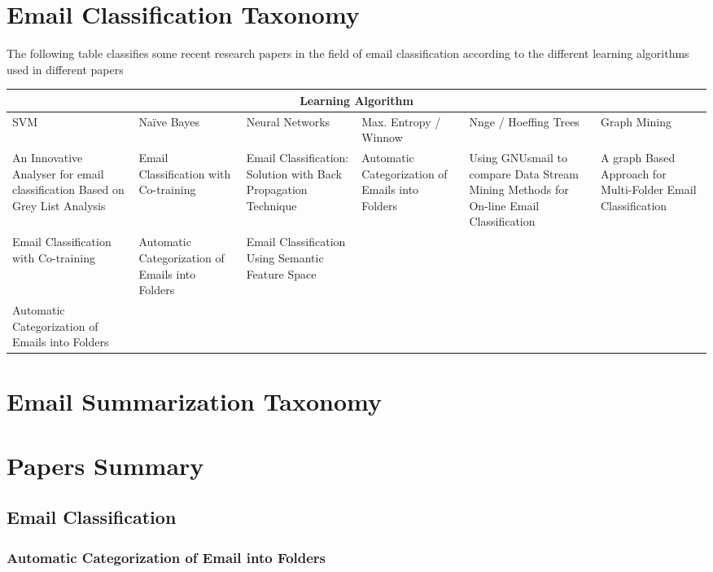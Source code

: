 \documentclass[12pt]{article}
\begin{document}
\section{Email Classification Taxonomy}
The following table classifies some recent research papers in the field of email classification according to the different learning algorithms used in different papers


\begin{tabular}{|p{2cm}|p{2cm}|p{2cm}|p{2cm}|p{2cm}|p{2cm}|}
\hline
\multicolumn{6}{|c|}{Learning Algorithm} \\
\hline
SVM & Naïve Bayes & Neural Networks & Max. Entropy / Winnow & Nnge / Hoeffing Trees & Graph Mining \\ \hline
An Innovative Analyser for email classification Based on Grey List Analysis &
Email Classification with Co-training &
Email Classification: Solution with Back Propagation Technique & 
Automatic Categorization of Emails into Folders &
Using GNUsmail to compare Data Stream Mining Methods for On-line Email Classification &
A graph Based Approach for Multi-Folder Email Classification \\ \hline

Email Classification with Co-training &
Automatic Categorization of Emails into Folders &
Email Classification Using Semantic Feature Space & 
&
&
 \\ \hline

Automatic Categorization of Emails into Folders &
&
& 
&
&

 \\
\hline
\end{tabular}

\section{Email Summarization Taxonomy}

\section{Papers Summary}
\subsection{Email Classification}

\subsubsection{Automatic Categorization of Email into Folders}
\end{document}
